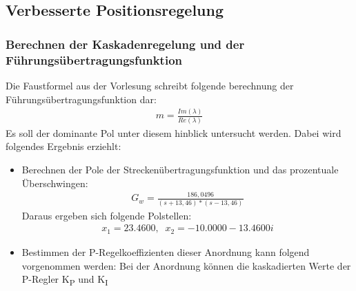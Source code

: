 \documentclass[10pt]{scrartcl}
\begin{document}
\subsection{Verbesserte Positionsregelung}
\subsubsection{Berechnen der Kaskadenregelung und der Führungsübertragungsfunktion}
Die Faustformel aus der Vorlesung schreibt folgende berechnung der Führungsübertragungsfunktion dar:
\begin{align}
   m=\frac{Im(\lambda)}{Re(\lambda)}
\end{align} 
Es soll der dominante Pol unter diesem hinblick untersucht werden. Dabei wird folgendes Ergebnis erziehlt:
\begin{itemize}
\item Berechnen der Pole der Streckenübertragungsfunktion und das prozentuale Überschwingen:
\begin{align}
G_{w} = \frac{186,0496}{(s+13,46) * (s-13,46)}
\end{align} 
Daraus ergeben sich folgende Polstellen:
\begin{align}
 x_1 = 23.4600 ,\,\,\
 x_2 =-10.0000 -13.4600i
\end{align}

\item Bestimmen der P-Regelkoeffizienten dieser Anordnung kann folgend vorgenommen werden:
Bei der Anordnung können die kaskadierten Werte der P-Regler K\textsubscript{P} und K\textsubscript{I} 


\end{itemize}
\end{document}
